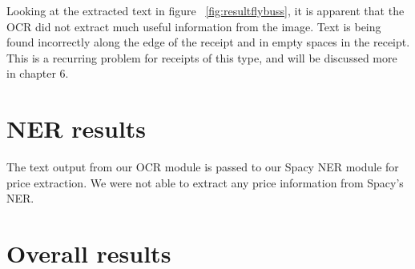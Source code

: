 Looking at the extracted text in figure \figurename{~\ref{fig:resultflybuss}}, it is apparent that the OCR did not
extract much useful information from the image.
Text is being found incorrectly along the edge of the receipt and in empty spaces in the receipt.
This is a recurring problem for receipts of this type, and will be discussed more in chapter 6.

\section{NER results}\label{sec:ner-results}
The text output from our OCR module is passed to our Spacy NER module for price extraction.
We were not able to extract any price information from Spacy's NER\@.

\section{Overall results}\label{sec:overall-results}

